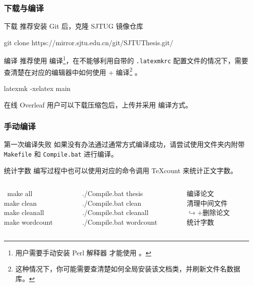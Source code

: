 \begin{frame}
  \frametitle{下载与编译}
  \alert{下载} 推荐安装 Git  后，克隆 SJTUG 镜像仓库
  \begin{exampleblock}{\faGit*}
    \ttfamily\small
    git clone https://mirror.sjtu.edu.cn/git/SJTUThesis.git/
  \end{exampleblock}

  \alert{编译} 推荐使用  编译\footnote{ 用户需要手动安装 Perl 解释器  才能使用 。}，在不能够利用自带的 \texttt{.latexmkrc} 配置文件的情况下，需要查清楚在对应的编辑器中如何使用  +  编译\footnote{这种情况下，你可能需要查清楚如何全局安装该文档类，并刷新文件名数据库。} 。
  \begin{exampleblock}{\faTerminal}
    \ttfamily\small
    latexmk -xelatex main
  \end{exampleblock}

  \alert{在线} Overleaf 用户可以下载压缩包后，上传并采用  编译方式。
\end{frame}

\begin{frame}
  \frametitle{手动编译}
  \alert{第一次编译失败} 如果没有办法通过通常方式编译成功，请尝试使用文件夹内附带 \faLinux{}\,\faApple{} \texttt{Makefile} 和 \faWindows{} \texttt{Compile.bat} 进行编译。

  \alert{统计字数} 编写过程中也可以使用对应的命令调用 \TeX{}count 来统计正文字数。
  \begin{columns}
    \begin{column}{0.38\textwidth}
      \begin{exampleblock}{\faLinux{}\,\faApple}
        \ttfamily
        make all\\
        make clean\\
        make cleanall\\
        make wordcount
      \end{exampleblock}
    \end{column}
    \begin{column}{0.38\textwidth}
      \begin{exampleblock}{\faWindows}
        \ttfamily
        ./Compile.bat thesis\\
        ./Compile.bat clean\\
        ./Compile.bat cleanall\\
        ./Compile.bat wordcount
      \end{exampleblock}
    \end{column}
    \begin{column}{0.24\textwidth}
      \begin{block}{\faInfo}
        \ttfamily
        编译论文\\
        清理中间文件\\
        $\hookrightarrow +$删除论文\\
        统计字数
      \end{block}
    \end{column}
  \end{columns}
\end{frame}

